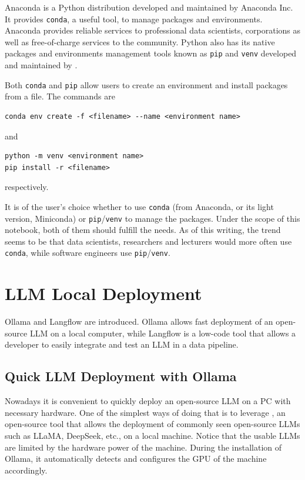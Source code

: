 \begin{shortbox}

Anaconda is a Python distribution developed and maintained by Anaconda Inc. It provides \verb|conda|, a useful tool, to manage packages and environments. Anaconda provides reliable services to professional data scientists, corporations as well as free-of-charge services to the community. Python also has its native packages and environments management tools known as \verb|pip| and \verb|venv| developed and maintained by .

Both \verb|conda| and \verb|pip| allow users to create an environment and install packages from a file. The commands are
\begin{lstlisting}
conda env create -f <filename> --name <environment name>
\end{lstlisting}
and
\begin{lstlisting}
python -m venv <environment name>
pip install -r <filename>
\end{lstlisting}
respectively.

It is of the user's choice whether to use \verb|conda| (from Anaconda, or its light version, Miniconda) or \verb|pip|/\verb|venv| to manage the packages. Under the scope of this notebook, both of them should fulfill the needs. As of this writing, the trend seems to be that data scientists, researchers and lecturers would more often use \verb|conda|, while software engineers use \verb|pip|/\verb|venv|.
\end{shortbox}

\section{LLM Local Deployment}

Ollama and Langflow are introduced. Ollama allows fast deployment of an open-source LLM on a local computer, while Langflow is a low-code tool that allows a developer to easily integrate and test an LLM in a data pipeline.

\subsection{Quick LLM Deployment with Ollama}

Nowadays it is convenient to quickly deploy an open-source LLM on a PC with necessary hardware. One of the simplest ways of doing that is to leverage , an open-source tool that allows the deployment of commonly seen open-source LLMs such as LLaMA, DeepSeek, etc., on a local machine. Notice that the usable LLMs are limited by the hardware power of the machine. During the installation of Ollama, it automatically detects and configures the GPU of the machine accordingly.

